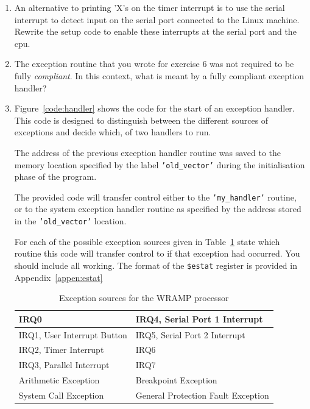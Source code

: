 \documentclass[a4paper,10pt]{article}
\begin{document}
\begin{enumerate}
\item An alternative to printing 'X's on the timer interrupt is to use the
serial interrupt to detect input on the serial port connected to the Linux
machine.  Rewrite the setup code to enable these interrupts at the serial port
and the cpu.


\item The exception routine that you wrote for exercise 6 was not required to be
fully {\em compliant}.  In this context, what is meant by a fully compliant
exception handler?


\newpage
\item Figure~\ref{code:handler} shows the code for the start of an
exception handler. This code is designed to distinguish between the
different sources of exceptions and decide which, of two handlers to
run.

The address of the previous exception handler routine was saved to the
memory location specified by the label \texttt{'old\_vector'} during
the initialisation phase of the program.

The provided code will transfer control either to the
\texttt{'my\_handler'} routine, or to the system exception handler
routine as specified by the address stored in the
\texttt{'old\_vector'} location.

For each of the possible exception sources given in
Table~\ref{table:esources} state which routine this code will transfer
control to if that exception had occurred. You should include all
working. The format of the \texttt{\$estat} register is provided in
Appendix~\ref{appen:estat}


\begin{table}[h]
\begin{center}
\begin{tabular}{|l|l|}
\hline
IRQ0 & IRQ4, Serial Port 1 Interrupt \\
\hline
IRQ1, User Interrupt Button & IRQ5, Serial Port 2 Interrupt\\
\hline
IRQ2, Timer Interrupt & IRQ6 \\
\hline
IRQ3, Parallel Interrupt & IRQ7 \\
\hline
Arithmetic Exception & Breakpoint Exception \\
\hline
System Call Exception & General Protection Fault Exception \\
\hline
\end{tabular}
\end{center}
\caption{Exception sources for the WRAMP processor}
\label{table:esources}
\end{table}


\end{enumerate}
\end{document}
